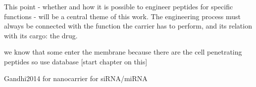 This point - whether and how it is possible to engineer peptides for specific functions - will be a central theme of this work. The engineering process must always be connected with the function the carrier has to perform, and its relation with its cargo: the drug.

we know that some enter the membrane because there are the cell penetrating peptides so use database [start chapter on this]

Gandhi2014 for nanocarrier for siRNA/miRNA
